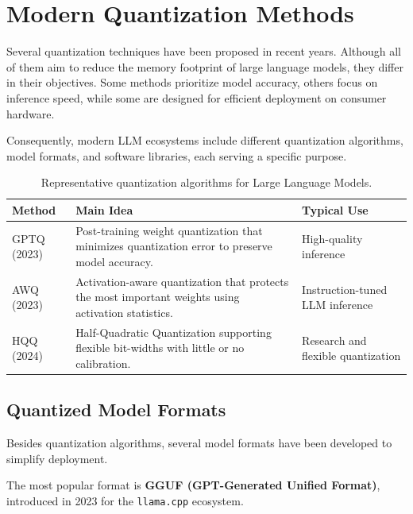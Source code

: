\section{Modern Quantization Methods}

Several quantization techniques have been proposed in recent years. Although all of them aim to reduce the memory footprint of large language models, they differ in their objectives. Some methods prioritize model accuracy, others focus on inference speed, while some are designed for efficient deployment on consumer hardware.

Consequently, modern LLM ecosystems include different quantization algorithms, model formats, and software libraries, each serving a specific purpose.
\begin{table}[H]
\centering
\caption{Representative quantization algorithms for Large Language Models.}
\label{tab:quantization_methods}

\renewcommand{\arraystretch}{1.3}

\begin{tabular}{p{2.3cm}p{8.2cm}p{3cm}}
\toprule
\textbf{Method} &
\textbf{Main Idea} &
\textbf{Typical Use} \\
\midrule

GPTQ (2023)
&
Post-training weight quantization that minimizes quantization error to preserve model accuracy.
&
High-quality inference
\\

AWQ (2023)
&
Activation-aware quantization that protects the most important weights using activation statistics.
&
Instruction-tuned LLM inference
\\

HQQ (2024)
&
Half-Quadratic Quantization supporting flexible bit-widths with little or no calibration.
&
Research and flexible quantization
\\

\bottomrule
\end{tabular}

\end{table}
\subsection*{Quantized Model Formats}

Besides quantization algorithms, several model formats have been developed to simplify deployment.

The most popular format is \textbf{GGUF (GPT-Generated Unified Format)}, introduced in 2023 for the \texttt{llama.cpp} ecosystem.

